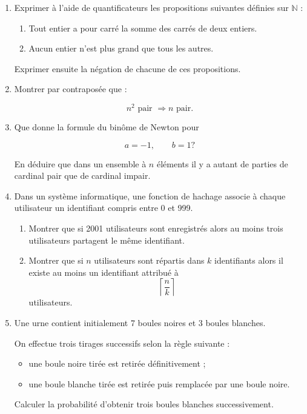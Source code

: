 \documentclass[12pt,a4paper]{article}
\begin{document}
\begin{enumerate}

\item Exprimer à l'aide de quantificateurs les propositions suivantes définies sur $\mathbb N$ :

\begin{enumerate}
\item Tout entier a pour carré la somme des carrés de deux entiers.
\item Aucun entier n'est plus grand que tous les autres.
\end{enumerate}

Exprimer ensuite la négation de chacune de ces propositions.

\item Montrer par contraposée que :

\[
n^2 \text{ pair } \Longrightarrow n \text{ pair}.
\]

\item Que donne la formule du binôme de Newton pour

\[
a=-1,\qquad b=1 ?
\]

En déduire que dans un ensemble à $n$ éléments il y a autant de parties de cardinal pair que de cardinal impair.

\item Dans un système informatique, une fonction de hachage associe à chaque utilisateur un identifiant compris entre 0 et 999.

\begin{enumerate}
\item Montrer que si 2001 utilisateurs sont enregistrés alors au moins trois utilisateurs partagent le même identifiant.
\item Montrer que si $n$ utilisateurs sont répartis dans $k$ identifiants alors il existe au moins un identifiant attribué à
\[
\left\lceil \frac{n}{k}\right\rceil
\]
utilisateurs.
\end{enumerate}

\item Une urne contient initialement 7 boules noires et 3 boules blanches.

On effectue trois tirages successifs selon la règle suivante :

\begin{itemize}
\item une boule noire tirée est retirée définitivement ;
\item une boule blanche tirée est retirée puis remplacée par une boule noire.
\end{itemize}

Calculer la probabilité d'obtenir trois boules blanches successivement.

\end{enumerate}
\end{document}
